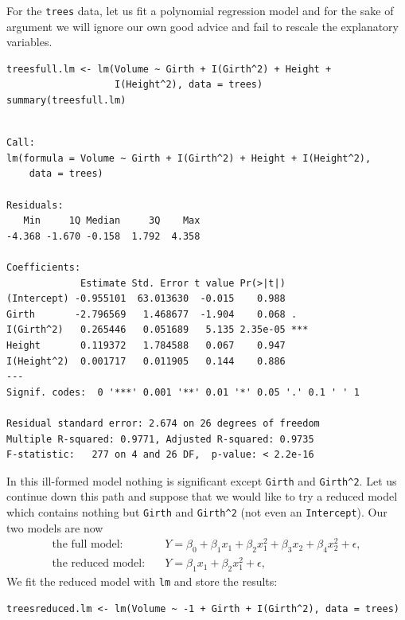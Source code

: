 \documentclass[captions=tableheading]{scrbook}
\begin{document}
\begin{example}

For the \texttt{trees} data, let us fit a polynomial regression model and for the sake of argument we will ignore our own good advice and fail to rescale the explanatory variables. 


\begin{verbatim}
treesfull.lm <- lm(Volume ~ Girth + I(Girth^2) + Height + 
                   I(Height^2), data = trees)
summary(treesfull.lm)
\end{verbatim}


\begin{verbatim}
 
Call:
lm(formula = Volume ~ Girth + I(Girth^2) + Height + I(Height^2), 
    data = trees)

Residuals:
   Min     1Q Median     3Q    Max 
-4.368 -1.670 -0.158  1.792  4.358 

Coefficients:
             Estimate Std. Error t value Pr(>|t|)    
(Intercept) -0.955101  63.013630  -0.015    0.988    
Girth       -2.796569   1.468677  -1.904    0.068 .  
I(Girth^2)   0.265446   0.051689   5.135 2.35e-05 ***
Height       0.119372   1.784588   0.067    0.947    
I(Height^2)  0.001717   0.011905   0.144    0.886    
---
Signif. codes:  0 '***' 0.001 '**' 0.01 '*' 0.05 '.' 0.1 ' ' 1 

Residual standard error: 2.674 on 26 degrees of freedom
Multiple R-squared: 0.9771,	Adjusted R-squared: 0.9735 
F-statistic:   277 on 4 and 26 DF,  p-value: < 2.2e-16
\end{verbatim}

In this ill-formed model nothing is significant except \texttt{Girth} and \texttt{Girth\textasciicircum{}2}. Let us continue down this path and suppose that we would like to try a reduced model which contains nothing but \texttt{Girth} and \texttt{Girth\textasciicircum{}2} (not even an \texttt{Intercept}). Our two models are now
\begin{align*} 
\mbox{the full model:} & \quad Y=\beta_{0}+\beta_{1}x_{1}+\beta_{2}x_{1}^{2}+\beta_{3}x_{2}+\beta_{4}x_{2}^{2}+\epsilon,\\
\mbox{the reduced model:} & \quad Y=\beta_{1}x_{1}+\beta_{2}x_{1}^{2}+\epsilon,
\end{align*}
We fit the reduced model with \texttt{lm} and store the results:


\begin{verbatim}
treesreduced.lm <- lm(Volume ~ -1 + Girth + I(Girth^2), data = trees)
\end{verbatim}


\end{example}
\end{document}
